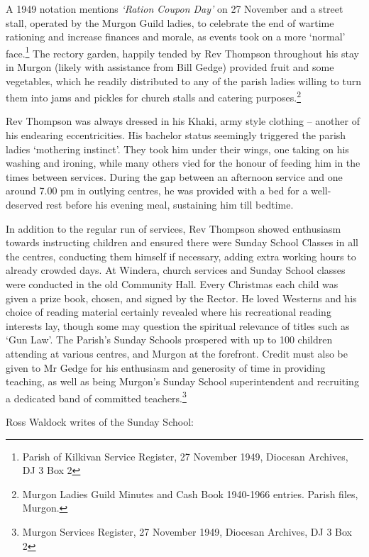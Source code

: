 A 1949 notation mentions \emph{`Ration Coupon Day'} on 27 November and a street stall, operated by the Murgon Guild ladies, to celebrate the end of wartime rationing and increase finances and morale, as events took on a more `normal' face.\footnote{Parish of Kilkivan Service Register, 27 November 1949, Diocesan Archives, DJ 3 Box 2} The rectory garden, happily tended by Rev Thompson throughout his stay in Murgon (likely with assistance from Bill Gedge) provided fruit and some vegetables, which he readily distributed to any of the parish ladies willing to turn them into jams and pickles for church stalls and catering purposes.\footnote{Murgon Ladies Guild Minutes and Cash Book 1940-1966 entries. Parish files, Murgon.}


Rev Thompson was always dressed in his Khaki, army style clothing -- another of his endearing eccentricities. His bachelor status seemingly triggered the parish ladies `mothering instinct'. They took him under their wings, one taking on his washing and ironing, while many others vied for the honour of feeding him in the times between services. During the gap between an afternoon service and one around 7.00 pm in outlying centres, he was provided with a bed for a well-deserved rest before his evening meal, sustaining him till bedtime.



In addition to the regular run of services, Rev Thompson showed enthusiasm towards instructing children and ensured there were Sunday School Classes in all the centres, conducting them himself if necessary, adding extra working hours to already crowded days. At Windera, church services and Sunday School classes were conducted in the old Community Hall. Every Christmas each child was given a prize book, chosen, and signed by the Rector. He loved Westerns and his choice of reading material certainly revealed where his recreational reading interests lay, though some may question the spiritual relevance of titles such as `Gun Law'. The Parish's Sunday Schools prospered with up to 100 children attending at various centres, and Murgon at the forefront. Credit must also be given to Mr Gedge for his enthusiasm and generosity of time in providing teaching, as well as being Murgon's Sunday School superintendent and recruiting a dedicated band of committed teachers.\footnote{Murgon Services Register, 27 November 1949, Diocesan Archives, DJ 3 Box 2}


Ross Waldock writes of the Sunday School:



